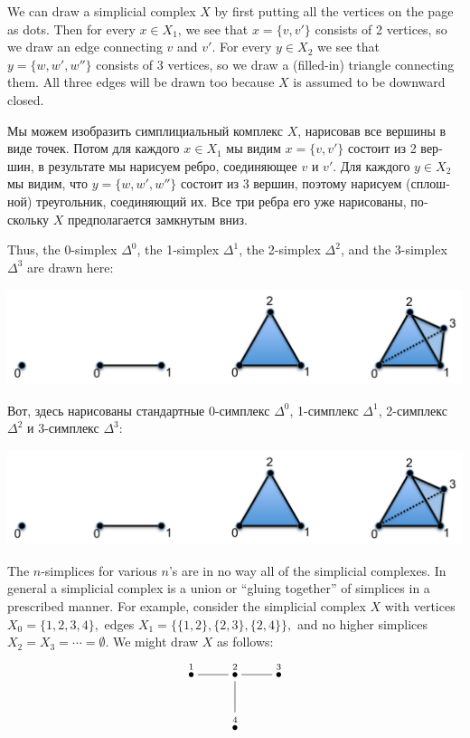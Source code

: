 \documentclass[a4paper]{book}
\newcommand{\LMO}[1]{\stackrel{#1}{\bullet}}
\theoremstyle{myth}
\begin{document}
\begin{russian}
We can draw a simplicial complex $X$ by first putting all the vertices on the page as dots. Then for every $x\in X_1$, we see that $x=\{v,v'\}$ consists of 2 vertices, so we draw an edge connecting $v$ and $v'$. For every $y\in X_2$ we see that $y=\{w,w',w''\}$ consists of 3 vertices, so we draw a (filled-in) triangle connecting them. All three edges will be drawn too because $X$ is assumed to be downward closed.

Мы можем изобразить симплициальный комплекс $X$, нарисовав все вершины в виде точек. Потом для каждого $x\in X_1$ мы видим $x=\{v,v'\}$ состоит из 2 вершин, в результате мы нарисуем ребро, соединяющее $v$ и $v'$. Для каждого $y\in X_2$ мы видим, что $y=\{w,w',w''\}$ состоит из 3 вершин, поэтому нарисуем (сплошной) треугольник, соединяющий их. Все три ребра его уже нарисованы, поскольку $X$ предполагается замкнутым вниз.

Thus, the 0-simplex $\Delta^0$, the 1-simplex $\Delta^1$, the 2-simplex $\Delta^2$, and the 3-simplex $\Delta^3$ are drawn here:
\begin{center}
\includegraphics[height=1.1in]{simplices}
\end{center} 

Вот, здесь нарисованы стандартные 0-симплекс $\Delta^0$, 1-симплекс $\Delta^1$, 2-симплекс $\Delta^2$ и 3-симплекс $\Delta^3$:
\begin{center}
\includegraphics[height=1.1in]{simplices}
\end{center} 

The $n$-simplices for various $n$'s are in no way all of the simplicial complexes. In general a simplicial complex is a union or “gluing together” of simplices in a prescribed manner. For example, consider the simplicial complex $X$ with vertices $X_0=\{1,2,3,4\},$ edges $X_1=\{\{1,2\},\{2,3\},\{2,4\}\},$ and no higher simplices $X_2=X_3=\cdots=\emptyset$. We might draw $X$ as follows:
$$\xymatrix{\LMO{1}\ar@{-}[r]&\LMO{2}\ar@{-}[r]\ar@{-}[d]&\LMO{3}\\&\LMO{4}}$$


\end{russian}
\end{document}

